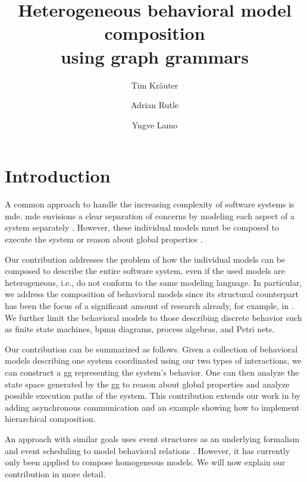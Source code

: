 \documentclass[a4paper]{easychair}
\title{Heterogeneous behavioral model composition \\
        using graph grammars}
\author{
Tim Kräuter
\and
Adrian Rutle
\and
Yngve Lamo
}
\institute{
  Høgskulen på Vestlandet\\
  Bergen, Norway\\
  \email{tkra@hvl.no, aru@hvl.no, yla@hvl.no}
 }
\begin{document}
\maketitle

\section{Introduction}
A common approach to handle the increasing complexity of software systems is \gls*{mde}.
\gls*{mde} envisions a clear separation of concerns by modeling each aspect of a system separately \cite{franceModeldrivenDevelopmentComplex2007}.
However, these individual models must be composed to execute the system or reason about global properties \cite{kienzleUnifyingFrameworkHomogeneous2019}.

Our contribution addresses the problem of how the individual models can be composed to describe the entire software system, even if the used models are heterogeneous, i.e., do not conform to the same modeling language.
In particular, we address the composition of behavioral models since its structural counterpart has been the focus of a significant amount of research already, for example, in \cite{kienzleUnifyingFrameworkHomogeneous2019, klareCommonalitiesPreservingConsistency2019, stunkelComprehensiveSystemsFormal2021}.
We further limit the behavioral models to those describing discrete behavior such as finite state machines, \gls*{bpmn} diagrams, process algebras, and Petri nets. %

Our contribution can be summarized as follows.
Given a collection of behavioral models describing one system coordinated using our two types of interactions, we can construct a \gls*{gg} representing the system's behavior.
One can then analyze the state space generated by the \gls*{gg} to reason about global properties and analyze possible execution paths of the system.
This contribution extends our work in \cite{krauterBehavioralConsistencyHeterogeneous2021} by adding asynchronous communication and an example showing how to implement hierarchical composition.

An approach with similar goals uses event structures as an underlying formalism and event scheduling to model behavioral relations \cite{kienzleUnifyingFrameworkHomogeneous2019}.
However, it has currently only been applied to compose homogeneous models.
We will now explain our contribution in more detail.
\end{document}
